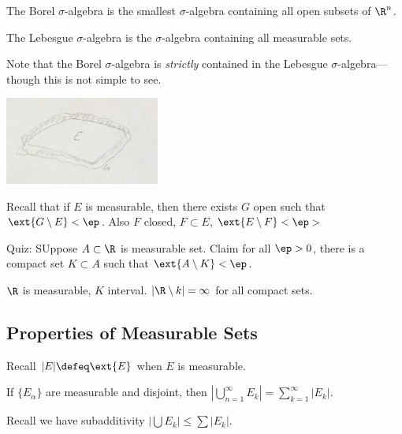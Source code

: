 \begin{dfn}
The Borel $\sigma$-algebra is the smallest $\sigma$-algebra containing all open subsets of $\R^n$. 
\end{dfn}


\begin{dfn}
The Lebesgue $\sigma$-algebra is the $\sigma$-algebra containing all measurable sets. 
\end{dfn}

Note that the Borel $\sigma$-algebra is \emph{strictly} contained in the Lebesgue $\sigma$-algebra---though this is not simple to see. 











   \includegraphics[width=2in]{rep1.png} 


Recall that if $E$ is measurable, then there exists $G$ open such that $\ext{G\setminus E}<\ep$. Also $F$ closed, $F \subset E$, $\ext{E\setminus F}<\ep$> 

Quiz: SUppose $A \subset \R$ is measurable set. Claim for all $\ep>0$, there is a compact set $K \subset A$ such that $\ext{A \setminus K}<\ep$. 

$\R$ is measurable, $K$ interval. $|\R \setminus k|=\infty$ for all compact sets. 




\subsection{Properties of Measurable Sets}

Recall $|E| \defeq \ext{E}$ when $E$ is measurable. 

\begin{thm}
If $\{E_\alpha\}$ are measurable and disjoint, then $\left|\bigcup_{n=1}^\infty E_k \right| = \sum_{k=1}^\infty |E_k|$. 
\end{thm}


Recall we have subadditivity $\left| \bigcup E_k \right| \leq \sum |E_k|$.

